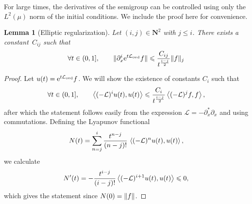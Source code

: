 \documentclass[11pt,a4paper]{article}
\newcommand{\e}{\mathrm{e}}
\newcommand{\nat}{\mathbf N}
\theoremstyle{plain}
\newtheorem{lemma}{Lemma}[section]
\numberwithin{equation}{section}
\renewcommand{\leq}{\leqslant}
\begin{document}
For large times,
the derivatives of the semigroup can be controlled using only the $L^2(\mu)$ norm of the initial conditions.
We include the proof here for convenience.
\begin{lemma}
    [Elliptic regularization]
    \label{lemma:elliptic_reg}
    Let $(i,j) \in \nat^2$ with $j \leq i$.
    There exists a constant~$C_{ij}$ such that
    \[
        \forall t \in (0, 1], \qquad
        \norm*{\partial_x^i \e^{t \mathcal L_{\rm ovd}} f} \leq \frac{C_{ij}}{t^{\frac{i-j}{2}}} \norm*{f}[j]
    \]
\end{lemma}
\begin{proof}
    Let $u(t) = \e^{t \mathcal L_{\rm ovd}} f$.
    We will show the existence of constants $C_i$ such that
    \[
        \forall t \in (0, 1], \qquad
        \ip{(-\mathcal L)^i u(t)}{u(t)}
        \leq \frac{C_i}{t^{\frac{i-j}2}} \ip{(-\mathcal L)^j f}{f},
    \]
    after which the statement follows easily from the expression $\mathcal L = - \partial_x^* \partial_x$ and using commutations.
    Defining the Lyapunov functional
    \[
        N(t) = \sum_{n=j}^{i} \frac{t^{n-j}}{(n-j)!} \, \ip{(-\mathcal L)^n u(t)}{u(t)} ,
    \]
    we calculate
    \[
        N'(t) =  - \frac{t^{i-j}}{(i-j)!} \ip{(- \mathcal L)^{i+1} u(t)}{u(t)} \leq 0,
    \]
    which gives the statement since $N(0) = \norm{f}$.
\end{proof}
\end{document}
